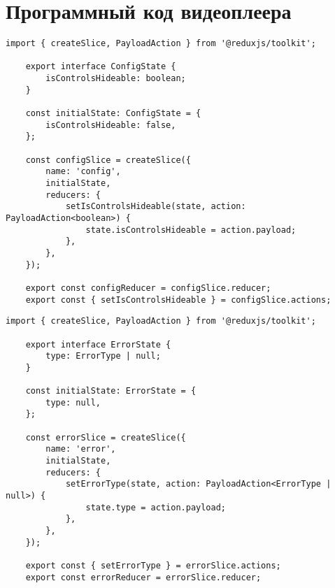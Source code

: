 \chapter{Программный код видеоплеера}

\begin{lstlisting}[caption={config/slice.ts}]
	import { createSlice, PayloadAction } from '@reduxjs/toolkit';
	
	export interface ConfigState {
		isControlsHideable: boolean;
	}
	
	const initialState: ConfigState = {
		isControlsHideable: false,
	};
	
	const configSlice = createSlice({
		name: 'config',
		initialState,
		reducers: {
			setIsControlsHideable(state, action: PayloadAction<boolean>) {
				state.isControlsHideable = action.payload;
			},     
		},
	});
	
	export const configReducer = configSlice.reducer;
	export const { setIsControlsHideable } = configSlice.actions;
\end{lstlisting}

\begin{lstlisting}[caption={error/slice.ts}]
	import { createSlice, PayloadAction } from '@reduxjs/toolkit';
	
	export interface ErrorState {
		type: ErrorType | null;
	}
	
	const initialState: ErrorState = {
		type: null,
	};
	
	const errorSlice = createSlice({
		name: 'error',
		initialState,
		reducers: {
			setErrorType(state, action: PayloadAction<ErrorType | null>) {
				state.type = action.payload;
			},
		},
	});
	
	export const { setErrorType } = errorSlice.actions;
	export const errorReducer = errorSlice.reducer;
\end{lstlisting}

